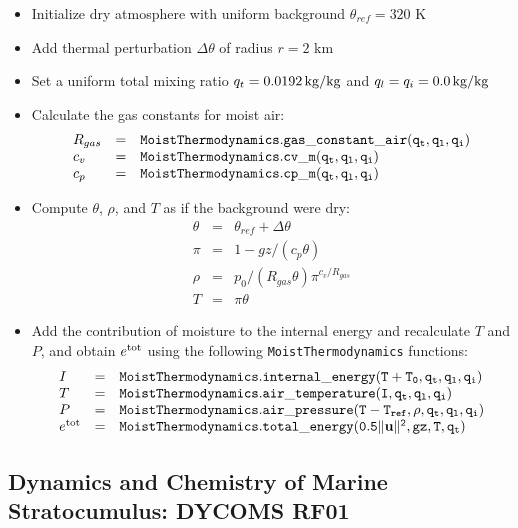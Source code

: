 \documentclass{article}
\begin{document}
\begin{itemize}
\item Initialize dry atmosphere with uniform background $\theta_{ref} = 320$ K
\item Add thermal perturbation $\Delta \theta$ of radius $r=2$ km
\item Set a uniform total mixing ratio $q_t = 0.0192 \,{\rm kg/kg}$ and $q_l = q_i = 0.0\,{\rm kg/kg}$
\item Calculate the gas constants for moist air: 
\[\begin{array}{lcl}
R_{gas} &=& {\tt MoistThermodynamics.gas\_constant\_air(q_t, q_l, q_i)}\\
c_v     &=& {\tt MoistThermodynamics.cv\_m(q_t, q_l, q_i)}\\
c_p     &=& {\tt MoistThermodynamics.cp\_m(q_t, q_l, q_i)}\\
\end{array}
\]
\item  Compute $\theta$, $\rho$, and $T$ as if the background were dry:\\
    \[ \begin{array}{lcl}
  \theta &=& \theta_{ref} + \Delta\theta\\
 \pi & =& 1 - gz/(c_p\theta)\\
 \rho & = & p_0/(R_{gas}\theta)\pi^{c_v/R_{gas}}\\
 T   & = &\pi \theta
\end{array}\]

\item Add the contribution of moisture to the internal energy and recalculate $T$ and $P$, and obtain $e^{\rm tot}$ using the following {\tt MoistThermodynamics} functions:
\[\begin{array}{lcl}
I &=& {\tt MoistThermodynamics.internal\_energy(T + T_0, q_t, q_l, q_i)}\\
T &=& {\tt MoistThermodynamics.air\_temperature(I, q_t, q_l, q_i)}\\
P &=& {\tt MoistThermodynamics.air\_pressure(T - T_{ref} , \rho, q_t, q_l, q_i)}\\
e^{\rm tot} &=& {\tt MoistThermodynamics.total\_energy(0.5\|{\bf u} \|^2, gz, T, q_t)}
\end{array}\]
\end{itemize}

\subsection{Dynamics and Chemistry of Marine Stratocumulus: DYCOMS RF01}
\end{document}
